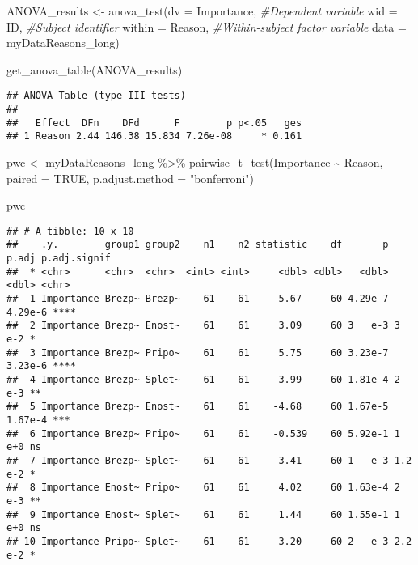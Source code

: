 \documentclass[
]{article}
\newenvironment{Shaded}{\begin{snugshade}}{\end{snugshade}}
\newcommand{\AttributeTok}[1]{\textcolor[rgb]{0.77,0.63,0.00}{#1}}
\newcommand{\CommentTok}[1]{\textcolor[rgb]{0.56,0.35,0.01}{\textit{#1}}}
\newcommand{\ConstantTok}[1]{\textcolor[rgb]{0.00,0.00,0.00}{#1}}
\newcommand{\FunctionTok}[1]{\textcolor[rgb]{0.00,0.00,0.00}{#1}}
\newcommand{\NormalTok}[1]{#1}
\newcommand{\OtherTok}[1]{\textcolor[rgb]{0.56,0.35,0.01}{#1}}
\newcommand{\SpecialCharTok}[1]{\textcolor[rgb]{0.00,0.00,0.00}{#1}}
\newcommand{\StringTok}[1]{\textcolor[rgb]{0.31,0.60,0.02}{#1}}
\begin{document}
\begin{Shaded}
\begin{Highlighting}[]
\NormalTok{ANOVA\_results }\OtherTok{\textless{}{-}} \FunctionTok{anova\_test}\NormalTok{(}\AttributeTok{dv =}\NormalTok{ Importance, }\CommentTok{\#Dependent variable}
                            \AttributeTok{wid =}\NormalTok{ ID, }\CommentTok{\#Subject identifier}
                            \AttributeTok{within =}\NormalTok{ Reason, }\CommentTok{\#Within{-}subject factor variable}
                            \AttributeTok{data =}\NormalTok{ myDataReasons\_long)}

\FunctionTok{get\_anova\_table}\NormalTok{(ANOVA\_results)}
\end{Highlighting}
\end{Shaded}

\begin{verbatim}
## ANOVA Table (type III tests)
## 
##   Effect  DFn    DFd      F        p p<.05   ges
## 1 Reason 2.44 146.38 15.834 7.26e-08     * 0.161
\end{verbatim}

\begin{Shaded}
\begin{Highlighting}[]
\NormalTok{pwc }\OtherTok{\textless{}{-}}\NormalTok{ myDataReasons\_long }\SpecialCharTok{\%\textgreater{}\%}
  \FunctionTok{pairwise\_t\_test}\NormalTok{(Importance }\SpecialCharTok{\textasciitilde{}}\NormalTok{ Reason, }
                  \AttributeTok{paired =} \ConstantTok{TRUE}\NormalTok{,}
                  \AttributeTok{p.adjust.method =} \StringTok{"bonferroni"}\NormalTok{)}

\NormalTok{pwc}
\end{Highlighting}
\end{Shaded}

\begin{verbatim}
## # A tibble: 10 x 10
##    .y.        group1 group2    n1    n2 statistic    df       p   p.adj p.adj.signif
##  * <chr>      <chr>  <chr>  <int> <int>     <dbl> <dbl>   <dbl>   <dbl> <chr>       
##  1 Importance Brezp~ Brezp~    61    61     5.67     60 4.29e-7 4.29e-6 ****        
##  2 Importance Brezp~ Enost~    61    61     3.09     60 3   e-3 3   e-2 *           
##  3 Importance Brezp~ Pripo~    61    61     5.75     60 3.23e-7 3.23e-6 ****        
##  4 Importance Brezp~ Splet~    61    61     3.99     60 1.81e-4 2   e-3 **          
##  5 Importance Brezp~ Enost~    61    61    -4.68     60 1.67e-5 1.67e-4 ***         
##  6 Importance Brezp~ Pripo~    61    61    -0.539    60 5.92e-1 1   e+0 ns          
##  7 Importance Brezp~ Splet~    61    61    -3.41     60 1   e-3 1.2 e-2 *           
##  8 Importance Enost~ Pripo~    61    61     4.02     60 1.63e-4 2   e-3 **          
##  9 Importance Enost~ Splet~    61    61     1.44     60 1.55e-1 1   e+0 ns          
## 10 Importance Pripo~ Splet~    61    61    -3.20     60 2   e-3 2.2 e-2 *
\end{verbatim}
\end{document}
